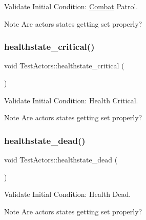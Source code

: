 Validate Initial Condition\+: \mbox{\hyperlink{classCombat}{Combat}} Patrol. 

\begin{DoxyNote}{Note}
Are actors states getting set properly? 
\end{DoxyNote}
\mbox{\label{classTestActors_af669a03e29de04c83ea90877f9f43b7e}} 
\subsubsection{\texorpdfstring{healthstate\+\_\+critical()}{healthstate\_critical()}}
{\footnotesize\ttfamily void Test\+Actors\+::healthstate\+\_\+critical (\begin{DoxyParamCaption}{ }\end{DoxyParamCaption})}



Validate Initial Condition\+: Health Critical. 

\begin{DoxyNote}{Note}
Are actors states getting set properly? 
\end{DoxyNote}
\mbox{\label{classTestActors_a1b8daaf31e1e3f23b53d1fcd9084d939}} 
\subsubsection{\texorpdfstring{healthstate\+\_\+dead()}{healthstate\_dead()}}
{\footnotesize\ttfamily void Test\+Actors\+::healthstate\+\_\+dead (\begin{DoxyParamCaption}{ }\end{DoxyParamCaption})}



Validate Initial Condition\+: Health Dead. 

\begin{DoxyNote}{Note}
Are actors states getting set properly? 
\end{DoxyNote}
\mbox{\label{classTestActors_ac3dfeafcbbd46c3ba0f17ec90b0f8260}} 
